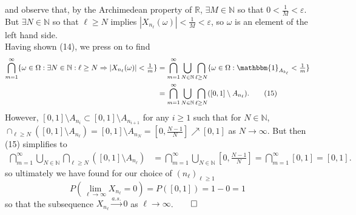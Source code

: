 \documentclass[10pt]{article}
\newcommand{\mbb}[1]{\mathbb{#1}}
\newcommand{\1}[1]{\mathbbm{1}_{#1}}
\begin{document}
    and observe that, by the Archimedean property of $\mbb{R}$, $\exists M\in\mbb{N}$ so that $0<\frac{1}{M}<\varepsilon$. But $\exists N\in\mbb{N}$ so that $\ell\geq N$ implies $|X_{n_\ell}(\omega)|<\tfrac{1}{M}<\varepsilon$, so $\omega$ is an element of the left hand side.\\[5pt]
    Having shown (14), we press on to find
    \begin{align*}
        \bigcap_{m=1}^\infty\{\omega\in\Omega:\exists N\in\mbb{N}:\ell\geq N\Rightarrow|X_{n_\ell}(\omega)|<\tfrac{1}{m}\}&=\bigcap_{m=1}^\infty\bigcup_{N\in\mbb{N}}\bigcap_{\ell\geq N}\{\omega\in\Omega:\1{A_{k_\ell}}<\tfrac{1}{m}\}\\
        &=\bigcap_{m=1}^\infty\bigcup_{N\in\mbb{N}}\bigcap_{\ell\geq N}([0,1]\setminus A_{n_\ell}).\tag{15}
    \end{align*}
    However, $[0,1]\setminus A_{n_i}\subset[0,1]\setminus A_{n_{i+1}}$ for any $i\geq 1$ such that for $N\in\mbb{N}$, $\cap_{\ell\geq N}([0,1]\setminus A_{n_\ell})=[0,1]\setminus A_{n_N}=[0,\tfrac{N-1}{N}]\nearrow[0,1]$ as $N\rightarrow\infty$.
    But then (15) simplifies to 
    \begin{align*}
        \bigcap_{m=1}^\infty\bigcup_{N\in\mbb{N}}\bigcap_{\ell\geq N}([0,1]\setminus A_{n_\ell})&=\bigcap_{m=1}^\infty\bigcup_{N\in\mbb{N}}[0,\tfrac{N-1}{N}]=\bigcap_{m=1}^\infty[0,1]=[0,1].
    \end{align*}
    so ultimately we have found for our choice of $(n_\ell)_{\ell\geq 1}$
    \[P(\lim_{\ell\rightarrow\infty}X_{n_\ell}=0)=P([0,1])=1-0=1\]
    so that the subsequence $X_{n_\ell}\overset{a.s.}{\longrightarrow}0$ as $\ell\rightarrow\infty$.\hfill{$\qed$}\\[5pt]
\end{document}
